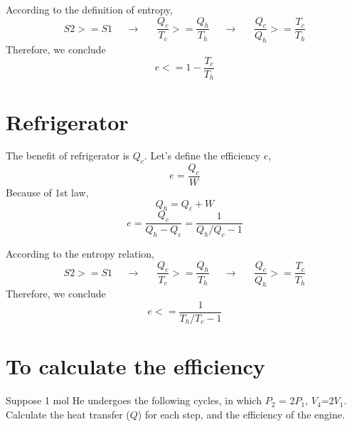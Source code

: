 According to the definition of entropy,
\begin{equation}    S2 >= S1              ~~~~~~\rightarrow~~~~~~~ 
       \frac{Q_c}{T_c} >= \frac{Q_h}{T_h} ~~~~~~\rightarrow~~~~~~~
       \frac{Q_c}{Q_h} >= \frac{T_c}{T_h} 
\end{equation}
Therefore, we conclude
\begin{equation} e<=1-\frac{T_c}{T_h} \end{equation}


\section{Refrigerator}
The benefit of refrigerator is $Q_c$. Let's define the efficiency $e$,
\begin{equation} e = \frac{Q_c}{W} \end{equation}
Because of 1st law,
\begin{equation} Q_h = Q_c + W \end{equation}
\begin{equation} e = \frac{Q_c}{Q_h-Q_c} = \frac{1}{Q_h/Q_c-1} \end{equation}

According to the entropy relation,
\begin{equation}    S2 >= S1              ~~~~~~\rightarrow~~~~~~~ 
       \frac{Q_c}{T_c} >= \frac{Q_h}{T_h} ~~~~~~\rightarrow~~~~~~~
       \frac{Q_c}{Q_h} >= \frac{T_c}{T_h} 
\end{equation}
Therefore, we conclude
\begin{equation} e<=\frac{1}{T_h/T_c-1} \end{equation}

\section{To calculate the efficiency}
Suppose 1 mol He undergoes the following cycles, in which $P_2$ = 2$P_1$, $V_4$=2$V_1$. Calculate 
the heat transfer ($Q$) for each step, and the efficiency of the engine.\\



